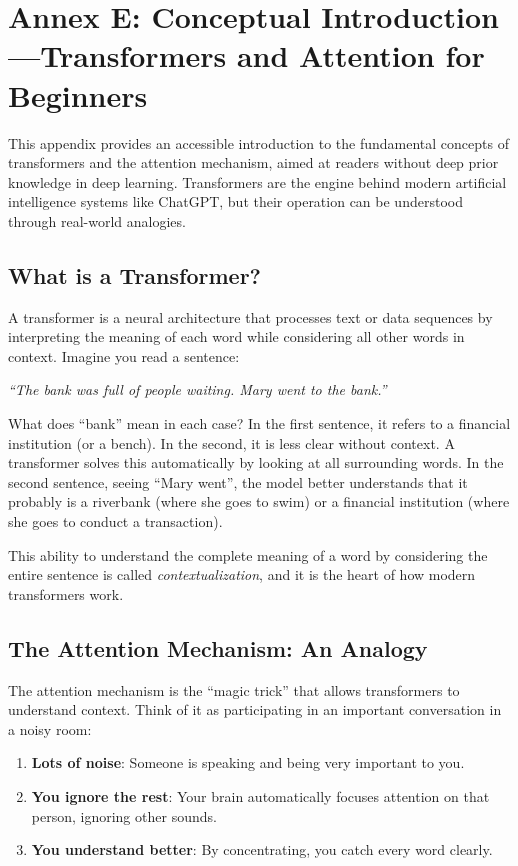 \section{Annex E: Conceptual Introduction---Transformers and Attention for Beginners}
\label{sec:annex-tutorial}

This appendix provides an accessible introduction to the fundamental concepts of transformers and the attention mechanism, aimed at readers without deep prior knowledge in deep learning. Transformers are the engine behind modern artificial intelligence systems like ChatGPT, but their operation can be understood through real-world analogies.

\subsection{What is a Transformer?}

A transformer is a neural architecture that processes text or data sequences by interpreting the meaning of each word while considering all other words in context. Imagine you read a sentence:

\begin{center}
\textit{``The bank was full of people waiting. Mary went to the bank.''}
\end{center}

What does ``bank'' mean in each case? In the first sentence, it refers to a financial institution (or a bench). In the second, it is less clear without context. A transformer solves this automatically by looking at all surrounding words. In the second sentence, seeing ``Mary went'', the model better understands that it probably is a riverbank (where she goes to swim) or a financial institution (where she goes to conduct a transaction).

This ability to understand the complete meaning of a word by considering the entire sentence is called \emph{contextualization}, and it is the heart of how modern transformers work.

\subsection{The Attention Mechanism: An Analogy}

The attention mechanism is the ``magic trick'' that allows transformers to understand context. Think of it as participating in an important conversation in a noisy room:

\begin{enumerate}[leftmargin=*]
    \item \textbf{Lots of noise}: Someone is speaking and being very important to you.
    \item \textbf{You ignore the rest}: Your brain automatically focuses attention on that person, ignoring other sounds.
    \item \textbf{You understand better}: By concentrating, you catch every word clearly.
\end{enumerate}

